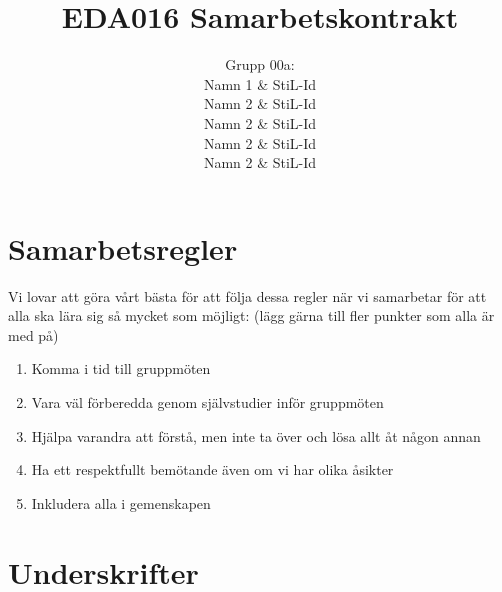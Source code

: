 \documentclass[12pt]{article} %
\title{EDA016 Samarbetskontrakt}
\author{Grupp 00a: \\ 
Namn 1 \& StiL-Id \\ 
Namn 2 \& StiL-Id \\ 
Namn 2 \& StiL-Id \\ 
Namn 2 \& StiL-Id \\ 
Namn 2 \& StiL-Id \\ 
}
\begin{document}
\maketitle

\section{Samarbetsregler}
Vi lovar att göra vårt bästa för att följa dessa regler när vi samarbetar för att alla ska lära sig så mycket som möjligt: (lägg gärna till fler punkter som alla är med på)
\begin{enumerate}
\item Komma i tid till gruppmöten
\item Vara väl förberedda genom självstudier inför gruppmöten
\item Hjälpa varandra att förstå, men inte ta över och lösa allt åt någon annan
\item Ha ett respektfullt bemötande även om vi har olika åsikter
\item Inkludera alla i gemenskapen
\end{enumerate}

\section{Underskrifter}
\end{document}
